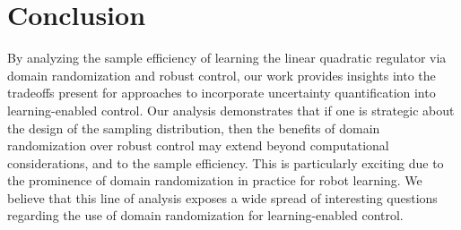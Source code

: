 \section{Conclusion}

By analyzing the sample efficiency of learning the linear quadratic regulator via domain randomization and robust control, our work provides insights into the tradeoffs present for approaches to incorporate uncertainty quantification into learning-enabled control. Our analysis demonstrates that if one is strategic about the design of the sampling distribution, then the benefits of domain randomization over robust control may extend beyond computational considerations, and to the sample efficiency. This is particularly exciting due to the prominence of domain randomization in practice for robot learning. We believe that this line of analysis exposes a wide spread of interesting questions regarding the use of domain randomization for learning-enabled control. 

